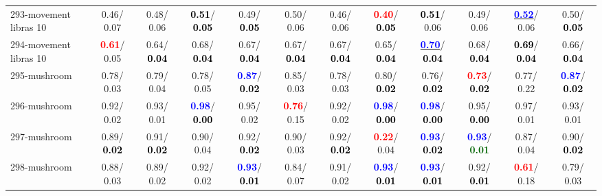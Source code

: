 \begin{table}[h]
\begin{center}
{\begin{tabular}{lc|c|c|c|c|c|c|c|c|c|c}
293-movement libras 10 &   0.46/  0.07 &   0.48/  0.06 & \textcolor{black}{\textbf{  0.51}}/\textcolor{black}{\textbf{  0.05}} &   0.49/\textcolor{black}{\textbf{  0.05}} &   0.50/  0.06 &   0.46/  0.06 & \textcolor{red}{\textbf{  0.40}}/\textcolor{black}{\textbf{  0.05}} & \textcolor{black}{\textbf{  0.51}}/  0.06 &   0.49/  0.06 & \underline{\textcolor{blue}{\textbf{  0.52}}}/  0.06 &   0.50/\textcolor{black}{\textbf{  0.05}} \\
294-movement libras 10 & \textcolor{red}{\textbf{  0.61}}/  0.05 &   0.64/\textcolor{black}{\textbf{  0.04}} &   0.68/\textcolor{black}{\textbf{  0.04}} &   0.67/\textcolor{black}{\textbf{  0.04}} &   0.67/\textcolor{black}{\textbf{  0.04}} &   0.67/\textcolor{black}{\textbf{  0.04}} &   0.65/\textcolor{black}{\textbf{  0.04}} & \underline{\textcolor{blue}{\textbf{  0.70}}}/\textcolor{black}{\textbf{  0.04}} &   0.68/\textcolor{black}{\textbf{  0.04}} & \textcolor{black}{\textbf{  0.69}}/\textcolor{black}{\textbf{  0.04}} &   0.66/\textcolor{black}{\textbf{  0.04}} \\
295-mushroom &   0.78/  0.03 &   0.79/  0.04 &   0.78/  0.05 & \textcolor{blue}{\textbf{  0.87}}/\textcolor{black}{\textbf{  0.02}} &   0.85/  0.03 &   0.78/  0.03 &   0.80/\textcolor{black}{\textbf{  0.02}} &   0.76/\textcolor{black}{\textbf{  0.02}} & \textcolor{red}{\textbf{  0.73}}/\textcolor{black}{\textbf{  0.02}} &   0.77/  0.22 & \textcolor{blue}{\textbf{  0.87}}/\textcolor{black}{\textbf{  0.02}} \\ \hline
296-mushroom &   0.92/  0.02 &   0.93/  0.01 & \textcolor{blue}{\textbf{  0.98}}/\textcolor{black}{\textbf{  0.00}} &   0.95/  0.02 & \textcolor{red}{\textbf{  0.76}}/  0.15 &   0.92/  0.02 & \textcolor{blue}{\textbf{  0.98}}/\textcolor{black}{\textbf{  0.00}} & \textcolor{blue}{\textbf{  0.98}}/\textcolor{black}{\textbf{  0.00}} &   0.95/\textcolor{black}{\textbf{  0.00}} &   0.97/  0.01 &   0.93/  0.01 \\
297-mushroom &   0.89/\textcolor{black}{\textbf{  0.02}} &   0.91/\textcolor{black}{\textbf{  0.02}} &   0.90/  0.04 &   0.92/\textcolor{black}{\textbf{  0.02}} &   0.90/  0.03 &   0.92/\textcolor{black}{\textbf{  0.02}} & \textcolor{red}{\textbf{  0.22}}/  0.04 & \textcolor{blue}{\textbf{  0.93}}/\textcolor{black}{\textbf{  0.02}} & \textcolor{blue}{\textbf{  0.93}}/\textcolor{darkgreen}{\textbf{  0.01}} &   0.87/  0.04 &   0.90/\textcolor{black}{\textbf{  0.02}} \\
298-mushroom &   0.88/  0.03 &   0.89/  0.02 &   0.92/  0.02 & \textcolor{blue}{\textbf{  0.93}}/\textcolor{black}{\textbf{  0.01}} &   0.84/  0.07 &   0.91/  0.02 & \textcolor{blue}{\textbf{  0.93}}/\textcolor{black}{\textbf{  0.01}} & \textcolor{blue}{\textbf{  0.93}}/\textcolor{black}{\textbf{  0.01}} &   0.92/\textcolor{black}{\textbf{  0.01}} & \textcolor{red}{\textbf{  0.61}}/  0.18 &   0.79/  0.03 \\

\end{tabular}}
\end{center}
\end{table}
